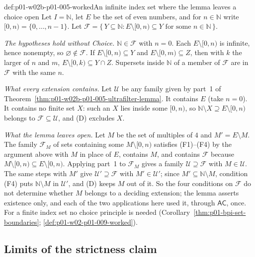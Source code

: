 \begin{hbexample}{def:p01-w02b-p01-005-worked}{An infinite index set where the lemma leaves a choice open}
Let \(I=\mathbb N\), let \(E\) be the set of even numbers, and for
\(n\in\mathbb N\) write \([0,n)=\{0,\ldots,n-1\}\). Let
\(\mathcal F=\{\,Y\subseteq\mathbb N:E\setminus[0,n)\subseteq Y\text{ for
some }n\in\mathbb N\,\}\).

\emph{The hypotheses hold without Choice.} \(\mathbb N\in\mathcal F\) with
\(n=0\). Each \(E\setminus[0,n)\) is infinite, hence nonempty, so
\(\varnothing\notin\mathcal F\). If \(E\setminus[0,n)\subseteq Y\) and
\(E\setminus[0,m)\subseteq Z\), then with \(k\) the larger of \(n\) and
\(m\), \(E\setminus[0,k)\subseteq Y\cap Z\). Supersets inside
\(\mathbb N\) of a member of \(\mathcal F\) are in \(\mathcal F\) with the
same \(n\).

\emph{What every extension contains.} Let \(\mathcal U\) be any family given
by part~1 of Theorem~\ref{thm:p01-w02b-p01-005-ultrafilter-lemma}. It
contains \(E\) (take \(n=0\)). It contains no finite set \(X\): such an
\(X\) lies inside some \([0,n)\), so \(\mathbb N\setminus X\supseteq
E\setminus[0,n)\) belongs to \(\mathcal F\subseteq\mathcal U\), and (D)
excludes \(X\).

\emph{What the lemma leaves open.} Let \(M\) be the set of multiples of
\(4\) and \(M'=E\setminus M\). The family \(\mathcal F_M\) of sets containing
some \(M\setminus[0,n)\) satisfies (F1)--(F4) by the argument above with
\(M\) in place of \(E\), contains \(M\), and contains \(\mathcal F\) because
\(M\setminus[0,n)\subseteq E\setminus[0,n)\). Applying part~1 to
\(\mathcal F_M\) gives a family \(\mathcal U\supseteq\mathcal F\) with
\(M\in\mathcal U\). The same steps with \(M'\) give
\(\mathcal U'\supseteq\mathcal F\) with \(M'\in\mathcal U'\); since
\(M'\subseteq\mathbb N\setminus M\), condition (F4) puts
\(\mathbb N\setminus M\) in \(\mathcal U'\), and (D) keeps \(M\) out of it.
So the four conditions on \(\mathcal F\) do not determine whether \(M\)
belongs to a deciding extension; the lemma asserts existence only, and each of
the two applications here used it, through \(\mathsf{AC}\), once. For a
finite index set no choice principle is needed
(Corollary~\ref{thm:p01-bpi-set-boundaries};
\cref{def:p01-w02-p01-009-worked}).
\end{hbexample}

\subsection{Limits of the strictness claim}
\label{sec:p01-w02b-p01-005-limits}

